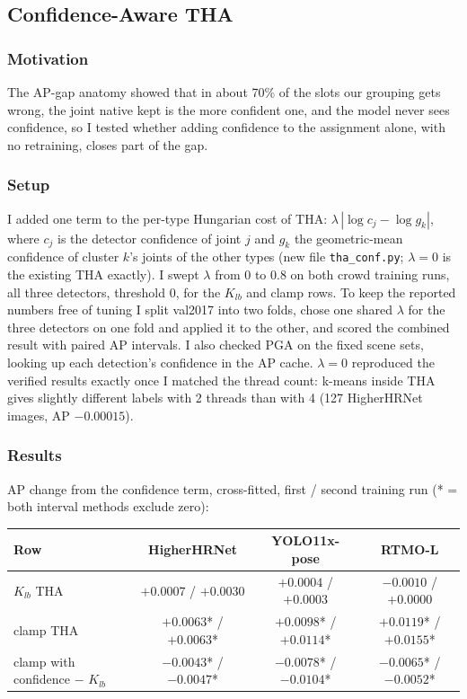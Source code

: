 \subsection{Confidence-Aware THA}

\subsubsection{Motivation}

The AP-gap anatomy showed that in about 70\% of the slots our grouping gets wrong, the joint native kept is the more confident one, and the model never sees confidence, so I tested whether adding confidence to the assignment alone, with no retraining, closes part of the gap.

\subsubsection{Setup}

I added one term to the per-type Hungarian cost of THA: $\lambda\,|\log c_j - \log g_k|$, where $c_j$ is the detector confidence of joint $j$ and $g_k$ the geometric-mean confidence of cluster $k$'s joints of the other types (new file \texttt{tha\_conf.py}; $\lambda = 0$ is the existing THA exactly).
I swept $\lambda$ from 0 to 0.8 on both crowd training runs, all three detectors, threshold 0, for the $K_{lb}$ and clamp rows.
To keep the reported numbers free of tuning I split val2017 into two folds, chose one shared $\lambda$ for the three detectors on one fold and applied it to the other, and scored the combined result with paired AP intervals.
I also checked PGA on the fixed scene sets, looking up each detection's confidence in the AP cache.
$\lambda = 0$ reproduced the verified results exactly once I matched the thread count: k-means inside THA gives slightly different labels with 2 threads than with 4 (127 HigherHRNet images, AP $-0.00015$).

\subsubsection{Results}

AP change from the confidence term, cross-fitted, first / second training run (* = both interval methods exclude zero):

{\small\setlength{\tabcolsep}{4pt}
\begin{tabular}{lccc}
\hline
\textbf{Row} & \textbf{HigherHRNet} & \textbf{YOLO11x-pose} & \textbf{RTMO-L} \\
\hline
$K_{lb}$ THA                    & $+0.0007$ / $+0.0030$ & $+0.0004$ / $+0.0003$ & $-0.0010$ / $+0.0000$ \\
clamp THA                       & $+0.0063$* / $+0.0063$* & $+0.0098$* / $+0.0114$* & $+0.0119$* / $+0.0155$* \\
clamp with confidence $-$ $K_{lb}$ & $-0.0043$* / $-0.0047$* & $-0.0078$* / $-0.0104$* & $-0.0065$* / $-0.0052$* \\
\hline
\end{tabular}
}

